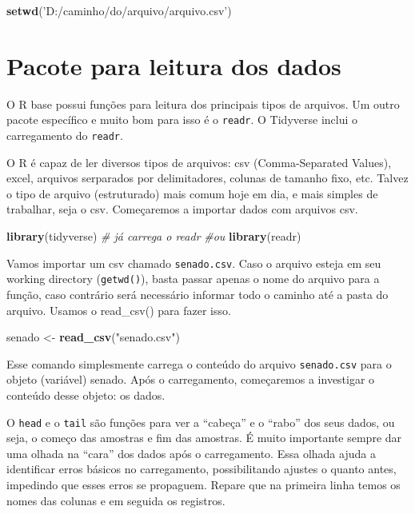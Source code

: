 \documentclass[]{book}
\newenvironment{Shaded}{\begin{snugshade}}{\end{snugshade}}
\newcommand{\KeywordTok}[1]{\textcolor[rgb]{0.13,0.29,0.53}{\textbf{#1}}}
\newcommand{\StringTok}[1]{\textcolor[rgb]{0.31,0.60,0.02}{#1}}
\newcommand{\CommentTok}[1]{\textcolor[rgb]{0.56,0.35,0.01}{\textit{#1}}}
\newcommand{\NormalTok}[1]{#1}
\begin{document}
\begin{Shaded}
\begin{Highlighting}[]
\KeywordTok{setwd}\NormalTok{(}\StringTok{'D:/caminho/do/arquivo/arquivo.csv'}\NormalTok{)}
\end{Highlighting}
\end{Shaded}

\section{Pacote para leitura dos
dados}\label{pacote-para-leitura-dos-dados}

O R base possui funções para leitura dos principais tipos de arquivos.
Um outro pacote específico e muito bom para isso é o \texttt{readr}. O
Tidyverse inclui o carregamento do \texttt{readr}.

O R é capaz de ler diversos tipos de arquivos: csv (Comma-Separated
Values), excel, arquivos serparados por delimitadores, colunas de
tamanho fixo, etc. Talvez o tipo de arquivo (estruturado) mais comum
hoje em dia, e mais simples de trabalhar, seja o csv. Começaremos a
importar dados com arquivos csv.

\begin{Shaded}
\begin{Highlighting}[]
\KeywordTok{library}\NormalTok{(tidyverse) }\CommentTok{# já carrega o readr}
\CommentTok{#ou}
\KeywordTok{library}\NormalTok{(readr)}
\end{Highlighting}
\end{Shaded}

Vamos importar um csv chamado \texttt{senado.csv}. Caso o arquivo esteja
em seu working directory (\texttt{getwd()}), basta passar apenas o nome
do arquivo para a função, caso contrário será necessário informar todo o
caminho até a pasta do arquivo. Usamos o read\_csv() para fazer isso.

\begin{Shaded}
\begin{Highlighting}[]
\NormalTok{senado <-}\StringTok{ }\KeywordTok{read_csv}\NormalTok{(}\StringTok{"senado.csv"}\NormalTok{)}
\end{Highlighting}
\end{Shaded}

Esse comando simplesmente carrega o conteúdo do arquivo
\texttt{senado.csv} para o objeto (variável) senado. Após o
carregamento, começaremos a investigar o conteúdo desse objeto: os
dados.

O \texttt{head} e o \texttt{tail} são funções para ver a ``cabeça'' e o
``rabo'' dos seus dados, ou seja, o começo das amostras e fim das
amostras. É muito importante sempre dar uma olhada na ``cara'' dos dados
após o carregamento. Essa olhada ajuda a identificar erros básicos no
carregamento, possibilitando ajustes o quanto antes, impedindo que esses
erros se propaguem. Repare que na primeira linha temos os nomes das
colunas e em seguida os registros.
\end{document}
